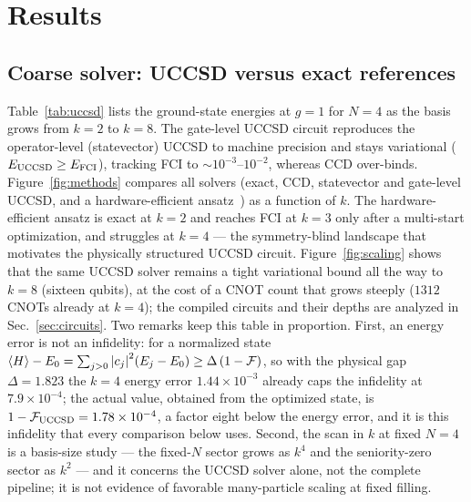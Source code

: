 \documentclass[
  aps,            %
  prc,            %
  reprint,        %
  superscriptaddress,
  floatfix,
  nofootinbib
]{revtex4-2}
\begin{document}
\section{Results}

\subsection{Coarse solver: UCCSD versus exact references}
\label{sec:res-uccsd}
Table~\ref{tab:uccsd} lists the ground-state energies at $g=1$ for $N=4$ as the basis
grows from $k=2$ to $k=8$.  The gate-level UCCSD circuit reproduces the operator-level
(statevector) UCCSD to machine precision and stays variational ($E_{\rm UCCSD}\ge
E_{\rm FCI}$), tracking FCI to $\sim10^{-3}$--$10^{-2}$, whereas CCD over-binds.
Figure~\ref{fig:methods} compares all solvers (exact, CCD, statevector and gate-level
UCCSD, and a hardware-efficient ansatz~\cite{Kandala2017}) as a function of $k$.  The hardware-efficient
ansatz is exact at $k=2$ and reaches FCI at $k=3$ only after a multi-start
optimization, and struggles at $k=4$ --- the symmetry-blind landscape that motivates
the physically structured UCCSD circuit.  Figure~\ref{fig:scaling} shows that the same
UCCSD solver remains a tight variational bound all the way to $k=8$ (sixteen qubits),
at the cost of a CNOT count that grows steeply ($1312$ CNOTs already at $k=4$); the
compiled circuits and their depths are analyzed in Sec.~\ref{sec:circuits}.
Two remarks keep this table in proportion.  First, an energy error is not an
infidelity: for a normalized state $\expval{H}-E_0=\sum_{j>0}\abs{c_j}^2(E_j-E_0)
\ge\Delta\,(1-\mathcal F)$, so with the physical gap $\Delta=1.823$ the $k=4$
energy error $1.44\times10^{-3}$ already caps the infidelity at
$7.9\times10^{-4}$; the actual value, obtained from the optimized state, is
$1-\mathcal F_{\rm UCCSD}=1.78\times10^{-4}$, a factor eight below the energy
error, and it is this infidelity that every comparison below uses.  Second, the
scan in $k$ at fixed $N=4$ is a basis-size study --- the fixed-$N$ sector grows
as $k^{4}$ and the seniority-zero sector as $k^{2}$ --- and it concerns the
UCCSD solver alone, not the complete pipeline; it is not evidence of favorable
many-particle scaling at fixed filling.
\end{document}
